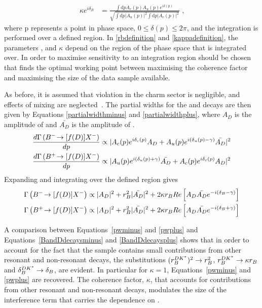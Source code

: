 \begin{align}
\kappa e^{i\delta_B} &= \frac{\int \mathrm{d}p A_c(p)A_u(p)e^{i\delta(p)}}{\sqrt{\int \mathrm{d}p \left|A_u(p)\right|^2 \int \mathrm{d}p \left|A_c(p)\right|^2}} \text{ ,}
\label{kappadefinition}
\end{align}
where p represents a point in phase space, $0 \leq \delta(p) \leq 2\pi$, and the integration is performed over a defined \Kstarm region. In \eqn\ref{rbdefinition} and \ref{kappadefinition}, the parameters \rb, \deltab and $\kappa$ depend on the region of the \decay{\Bm}{\D\KS\pim} phase space that is integrated over. In order to maximise sensitivity to \Pgamma an integration region should be chosen that finds the optimal working point between maximising the coherence factor and maximising the size of the data sample available.

As before, it is assumed that \CP violation in the charm sector is negligible, and effects of \D mixing are neglected~\cite{charmcpv,charmmixing}. The partial widths for the \Bm and \Bp decays are then given by Equations \ref{partialwidthminus} and \ref{partialwidthplus}, where $A_D$ is the amplitude of  and $\bar{A_{D}}$ is the amplitude of .
\begin{align}
\frac{d\Gamma\left({{{B}^-}}\!\rightarrow [f(D)]X^-\right)}{dp} &\propto | A_c(p) e^{i\delta_c(p)}A_{D} + A_u(p) e^{i(\delta_u(p) - \gamma)}\bar{A_{D}} |^2 \label{partialwidthminus} \\
\frac{d\Gamma\left({{{B}^+}}\!\rightarrow [f(D)]X^-\right)}{dp} &\propto | A_u(p) e^{i(\delta_u(p) + \gamma)}\bar{A_{D}} + A_c(p) e^{i\delta_c(p)}A_{D} |^2 \label{partialwidthplus}
\end{align}
Expanding and integrating over the defined \Kstar region gives
\begin{align}
\Gamma\left({{{B}^-}}\!\rightarrow [f(D)]X^-\right) &\propto |A_D|^2 + r_B^2 |\bar{A_{D}}|^2 + 2\kappa r_B Re\left[ A_D \bar{A_{D}} e^{-i(\delta_B - \gamma)} \right] \label{BandDdecaysminus} \\
\Gamma\left({{{B}^+}}\!\rightarrow [f(D)]X^-\right) &\propto |A_D|^2 + r_B^2 |\bar{A_{D}}|^2 + 2\kappa r_B Re\left[ A_D \bar{A_{D}} e^{-i(\delta_B + \gamma)} \right] \label{BandDdecaysplus}
\end{align}

A comparison between Equations~\ref{pwminus} and \ref{pwplus} and Equations~\ref{BandDdecaysminus} and \ref{BandDdecaysplus} shows that in order to account for the fact that the \decay{\Bm}{\D\Kstarm} sample contains small contributions from other resonant and non-resonant \decay{\Bm}{\D\KS\pim} decays, the substitutions $(r_B^{DK^*})^2 \rightarrow r_B^2$, $r_B^{DK^*} \rightarrow \kappa r_B$ and $\delta_B^{DK^*} \rightarrow \delta_B$, are evident. In particular for $\kappa = 1$, Equations~\ref{pwminus} and \ref{pwplus} are recovered. The coherence factor, $\kappa$, that accounts for contributions from other resonant and non-resonant \decay{\Bm}{\D\KS\pim} decays, modulates the size of the interference term that carries the dependence on \Pgamma.

